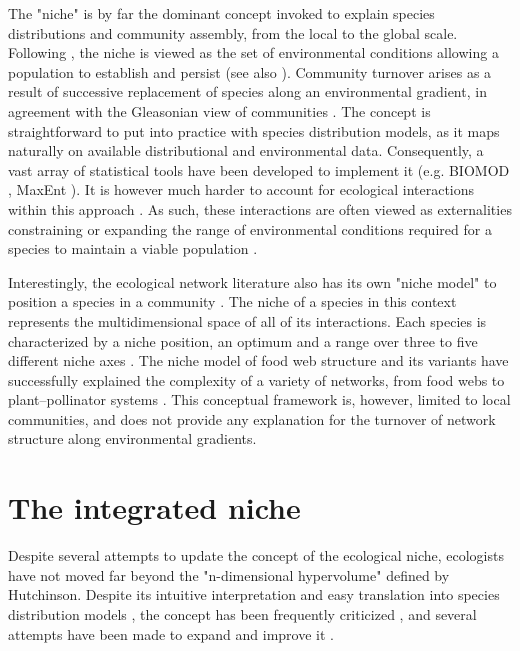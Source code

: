 \documentclass[12pt]{article}
\begin{document}
The "niche" is by far the dominant concept invoked to explain species
distributions and community assembly, from the local to the global scale.
Following \citealt{Hutchinson1957}, the niche is viewed as the set of
environmental conditions allowing a population to establish and persist (see
also \citealt{Holt2009}). Community turnover arises as a result of successive
replacement of species along an environmental gradient, in agreement with the
Gleasonian view of communities \citep{Gleason1926}. The concept is
straightforward to put into practice with species distribution models, as it
maps naturally on available distributional and environmental data. Consequently, a vast array of statistical tools have been developed to
implement it (e.g. BIOMOD \citealt{Thuiller2003}, MaxEnt
\citealt{Phillips2006}). It is however much harder to account for ecological
interactions within this approach \citep{Peterson2011}. As such, these
interactions are often viewed as externalities constraining or expanding the
range of environmental conditions required for a species to maintain a viable
population \citep{Pulliam2000, Soberon2007, Boulangeat2012}.

Interestingly, the ecological network literature also has its own "niche
model" to position a species in a community \citep{Williams2000}. The niche of
a species in this context represents the multidimensional space of all of its
interactions. Each species is characterized by a niche position, an optimum
and a range over three to five different niche axes \citep{Williams2000, Eklof2013}.
The niche model of food web structure and its variants have successfully
explained the complexity of a variety of networks, from food webs to
plant–pollinator systems \citep{Allesina2008, Williams2010, Eklof2013}. This
conceptual framework is, however, limited to local communities, and does not
provide any explanation for the turnover of network structure along
environmental gradients.

\section*{The integrated niche}

Despite several attempts to update the concept of the ecological niche,
ecologists have not moved far beyond the "n-dimensional hypervolume" defined
by Hutchinson. Despite its intuitive interpretation and easy translation into
species distribution models \citep{Boulangeat2012, Blonder2014}, the concept
has been frequently criticized \citep{Hardin1960, Peters1991, Silvertown2004},
and several attempts have been made to expand and improve it
\citep{Pulliam2000, Chase2003, Soberon2007, Holt2009, McInerny2012b}.
\end{document}

